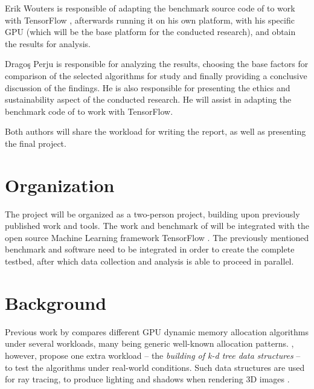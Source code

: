 \documentclass[12pt,twoside]{article}
\begin{document}
Erik Wouters is responsible of adapting the benchmark source code of \cite{Vinkler2015} to work with TensorFlow \cite{abadi2016}, afterwards running it on his own platform, with his specific GPU (which will be the base platform for the conducted research), and obtain the results for analysis.

Dragoş Perju is responsible for analyzing the results, choosing the base factors for comparison of the selected algorithms for study and finally providing a conclusive discussion of the findings. He is also responsible for presenting the ethics and sustainability aspect of the conducted research. He will assist in adapting the benchmark code of \cite{Vinkler2015} to work with TensorFlow.

Both authors will share the workload for writing the report, as well as presenting the final project.

\section{Organization}
\label{sec:organization}


The project will be organized as a two-person project, building upon previously published work and tools. The work and benchmark of \citeauthor{Vinkler2015} \cite{Vinkler2015} will be integrated with the open source Machine Learning framework TensorFlow \cite{abadi2016}. The previously mentioned benchmark and software need to be integrated in order to create the complete testbed, after which data collection and analysis is able to proceed in parallel.

\section{Background}
\label{sec:background}


Previous work by \citeauthor{Vinkler2015} \cite{Vinkler2015} compares different GPU dynamic memory allocation algorithms under several workloads, many being generic well-known allocation patterns. \citeauthor{Vinkler2015}, however, propose one extra workload -- the \textit{building of k-d tree data structures} -- to test the algorithms under real-world conditions. Such data structures are used for ray tracing, to produce lighting and shadows when rendering 3D images \cite{Wald_Havran_2006} \cite{Rademacher_1997}.
\end{document}
